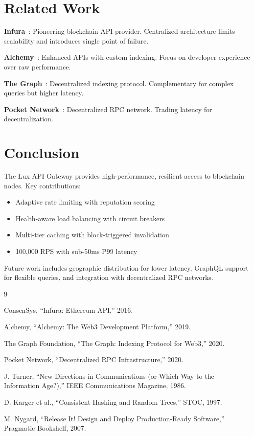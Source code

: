 \documentclass[11pt,a4paper]{article}
\begin{document}
\section{Related Work}

\textbf{Infura}~\cite{infura}: Pioneering blockchain API provider. Centralized architecture limits scalability and introduces single point of failure.

\textbf{Alchemy}~\cite{alchemy}: Enhanced APIs with custom indexing. Focus on developer experience over raw performance.

\textbf{The Graph}~\cite{thegraph}: Decentralized indexing protocol. Complementary for complex queries but higher latency.

\textbf{Pocket Network}~\cite{pocket}: Decentralized RPC network. Trading latency for decentralization.

\section{Conclusion}

The Lux API Gateway provides high-performance, resilient access to blockchain nodes. Key contributions:

\begin{itemize}
    \item Adaptive rate limiting with reputation scoring
    \item Health-aware load balancing with circuit breakers
    \item Multi-tier caching with block-triggered invalidation
    \item 100,000 RPS with sub-50ms P99 latency
\end{itemize}

Future work includes geographic distribution for lower latency, GraphQL support for flexible queries, and integration with decentralized RPC networks.

\begin{thebibliography}{9}

ConsenSys, ``Infura: Ethereum API,'' 2016.

Alchemy, ``Alchemy: The Web3 Development Platform,'' 2019.

The Graph Foundation, ``The Graph: Indexing Protocol for Web3,'' 2020.

Pocket Network, ``Decentralized RPC Infrastructure,'' 2020.

J. Turner, ``New Directions in Communications (or Which Way to the Information Age?),'' IEEE Communications Magazine, 1986.

D. Karger et al., ``Consistent Hashing and Random Trees,'' STOC, 1997.

M. Nygard, ``Release It! Design and Deploy Production-Ready Software,'' Pragmatic Bookshelf, 2007.

\end{thebibliography}
\end{document}
